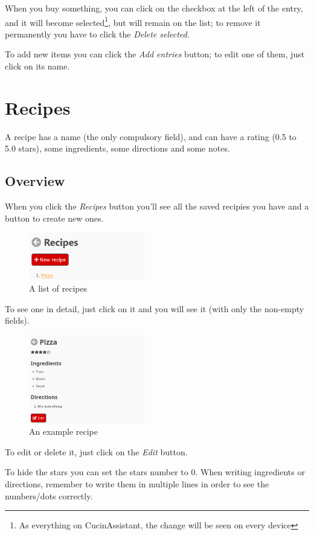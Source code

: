 \documentclass[12pt, a4paper]{report}
\begin{document}
    When you buy something, you can click on the checkbox at the left of the entry, and it will become selected\footnote{As everything on
    CucinAssistant, the change will be seen on every device}, but will remain on the list; to remove it permanently you have to click the
    \emph{Delete selected}.

    To add new items you can click the \emph{Add entries} button; to edit one of them, just click on its name.



    \chapter{Recipes} \label{recipes}

    A recipe has a name (the only compulsory field), and can have a rating (0.5 to 5.0 stars), some ingredients, some directions and some notes.

    \section{Overview}

    When you click the \emph{Recipes} button you'll see all the saved recipies you have and a button to create new ones.

    \begin{figure}[H]
        \centering
        \includegraphics[width=0.45\textwidth]{assets/en/recipes.png}
        \caption{A list of recipes}
    \end{figure}

    To see one in detail, just click on it and you will see it (with only the non-empty fields).

    \begin{figure}[H]
        \centering
        \includegraphics[width=0.45\textwidth]{assets/en/recipe.png}
        \caption{An example recipe}
    \end{figure}

    To edit or delete it, just click on the \emph{Edit} button.

    To hide the stars you can set the stars number to 0. When writing ingredients or directions, remember to write them in multiple lines in order to
    see the numbers/dots correctly.
\end{document}
